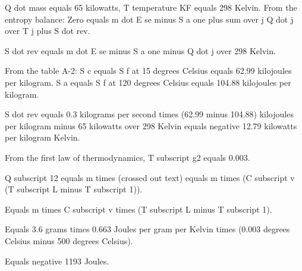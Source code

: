 Q dot mass equals 65 kilowatts, T temperature KF equals 298 Kelvin.  
From the entropy balance:  
Zero equals m dot E se minus S a one plus sum over j Q dot j over T j plus S dot rev.  

S dot rev equals m dot E se minus S a one minus Q dot j over 298 Kelvin.  

From the table A-2:  
S c equals S f at 15 degrees Celsius equals 62.99 kilojoules per kilogram.  
S a equals S f at 120 degrees Celsius equals 104.88 kilojoules per kilogram.  

S dot rev equals 0.3 kilograms per second times (62.99 minus 104.88) kilojoules per kilogram minus 65 kilowatts over 298 Kelvin equals negative 12.79 kilowatts per kilogram Kelvin.

From the first law of thermodynamics, T subscript g2 equals 0.003.

Q subscript 12 equals m times (crossed out text) equals m times (C subscript v (T subscript L minus T subscript 1)).

Equals m times C subscript v times (T subscript L minus T subscript 1).

Equals 3.6 grams times 0.663 Joules per gram per Kelvin times (0.003 degrees Celsius minus 500 degrees Celsius).

Equals negative 1193 Joules.